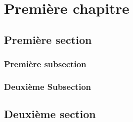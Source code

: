 \chapter{Première chapitre}
\section{Première section}
\subsection{Première subsection}


\subsection{Deuxième Subsection}


\section{Deuxième section}


